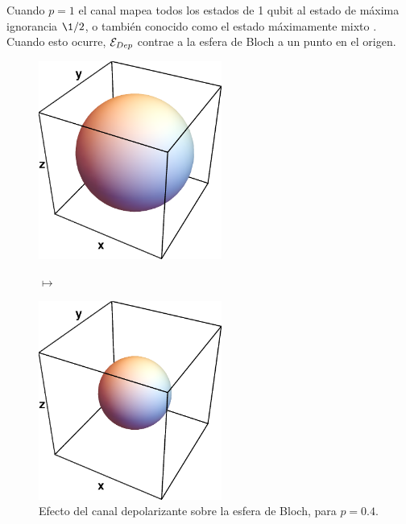 Cuando $p=1$ el canal mapea todos los estados 
de 1 qubit al estado de máxima ignorancia $\1/2$, 
o también conocido como el estado máximamente mixto 
\cite{bengtsson_zyczkowski_2017}. Cuando esto ocurre, 
$\mathcal{E}_{Dep}$ contrae a la esfera de Bloch a un punto en el origen.
\begin{figure}
    \centering
    \begin{minipage}{.4\textwidth}
        \centering
        \includegraphics[width=6cm]{images/bloch-ball}
    \end{minipage}
    $\longmapsto$
    \begin{minipage}{0.4\textwidth}
        \centering
        \includegraphics[width=6cm]{images/depolarizing}
    \end{minipage}
    \caption{Efecto del canal depolarizante sobre la esfera de Bloch, 
    para $p=0.4$.}
    \label{fig:depolarizing}
\end{figure}

